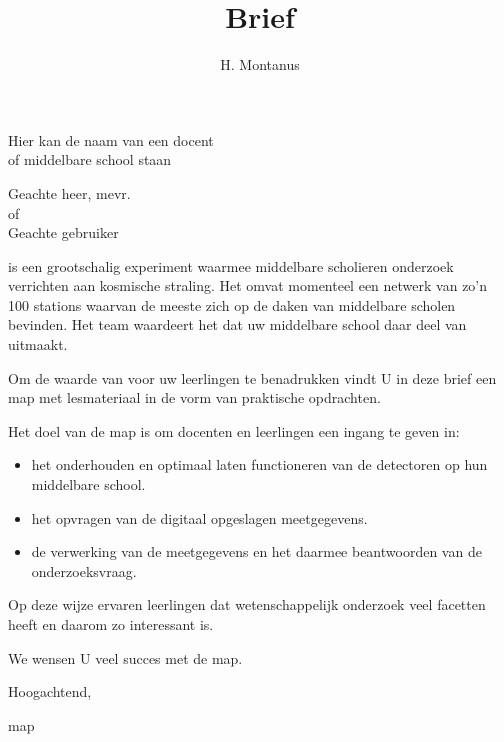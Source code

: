 




\title{Brief}
\author{H. Montanus}
\date{}

\maketitle
 
Hier kan de naam van een docent \\ of middelbare school staan

Geachte heer, mevr.  \\of   \\Geachte \hisparc gebruiker

\hisparc is een grootschalig experiment waarmee middelbare scholieren
onderzoek verrichten aan kosmische straling. Het omvat momenteel een
netwerk van zo'n 100 stations waarvan de meeste zich op de daken van
middelbare scholen bevinden. Het \hisparc team waardeert het dat uw
middelbare school daar deel van uitmaakt.  

Om de waarde van \hisparc voor uw leerlingen te benadrukken vindt U in
deze brief een \hisparc map met lesmateriaal in de vorm van praktische opdrachten.

Het doel van de \hisparc map is om docenten en leerlingen een ingang te geven in:
\begin{itemize}
\item het onderhouden en optimaal laten functioneren van de detectoren op hun middelbare school. 
\item het opvragen van de digitaal opgeslagen meetgegevens.
\item de verwerking van de meetgegevens en het daarmee beantwoorden van de onderzoeksvraag.
\end{itemize}

Op deze wijze ervaren leerlingen dat wetenschappelijk onderzoek veel facetten heeft en daarom zo interessant is. 

We wensen U veel succes met de \hisparc map.
 
Hoogachtend,

\hisparc map
 
 

